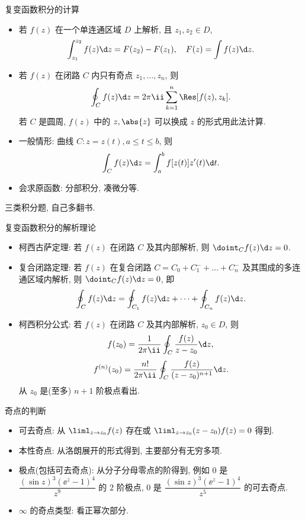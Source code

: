 \documentclass[aspectratio=169,handout]{ctexbeamer}
\begin{document}
\begin{frame}{复变函数积分的计算}
	\beqskip{3pt}
	\begin{itemize}
		\item 若 $f(z)$ 在一个单连通区域 $D$ 上解析, 且 $z_1,z_2\in D$,
	\[
			\int_{z_1}^{z_2}f(z)\d z=F(z_2)-F(z_1),\quad
			F(z)=\int f(z)\d z.
	\]
		\item 若 $f(z)$ 在闭路 $C$ 内只有奇点 $z_1,\dots,z_n$, 则
	\[
			\oint_C f(z)\d z=2\pi\ii\sum_{k=1}^n\Res[f(z),z_k].
	\]
		若 $C$ 是圆周, $f(z)$ 中的 $z,\abs{z}$ 可以换成 $z$ 的形式用此法计算.
		\item 一般情形: 曲线 $C:z=z(t),a\le t\le b$, 则
	\[
			\int_C f(z)\d z=\int_a^b f[z(t)]z'(t)\d t.
	\]
		\item 会求原函数: 分部积分, 凑微分等.
	\end{itemize}
	\onslide<+->
	\begin{exercise}
		三类积分题, 自己多翻书.
	\end{exercise}
	\endgroup
\end{frame}


\begin{frame}{复变函数积分的解析理论}
	\begin{itemize}
		\item 柯西古萨定理: 若 $f(z)$ 在闭路 $C$ 及其内部解析, 则 $\doint_Cf(z)\d z=0$.
		\item 复合闭路定理: 若 $f(z)$ 在复合闭路 $C=C_0+C_1^-+\dots+C_n^-$ 及其围成的多连通区域内解析, 则 $\doint_Cf(z)\d z=0$, 即
	\[
			\oint_Cf(z)\d z=\oint_{C_1}f(z)\d z+\cdots+\oint_{C_n}f(z)\d z.
	\]
		\item 柯西积分公式: 若 $f(z)$ 在闭路 $C$ 及其内部解析, $z_0\in D$, 则
	\[
			f(z_0)=\frac{1}{2\pi\ii}\oint_C\frac{f(z)}{z-z_0}\d z,
	\]
	\[
			f^{(n)}(z_0)=\frac{n!}{2\pi\ii}\oint_C\frac{f(z)}{(z-z_0)^{n+1}}\d z.
	\]
		从 $z_0$ 是(至多) $n+1$ 阶极点看出.
	\end{itemize}
\end{frame}


\begin{frame}{奇点的判断}
	\begin{itemize}
		\item 可去奇点: 从 $\liml_{z\to z_0}f(z)$ 存在或 $\liml_{z\to z_0}(z-z_0)f(z)=0$ 得到.
		\item 本性奇点: 从洛朗展开的形式得到, 主要部分有无穷多项.
		\item 极点(包括可去奇点): 从分子分母零点的阶得到, 例如
		$0$ 是 $\dfrac{(\sin z)^3(\ee^z-1)^4}{z^9}$ 的 $2$ 阶极点,
		$0$ 是 $\dfrac{(\sin z)^3(\ee^z-1)^4}{z^5}$ 的可去奇点.
		\item $\infty$ 的奇点类型: 看正幂次部分.
	\end{itemize}
\end{frame}
\end{document}
